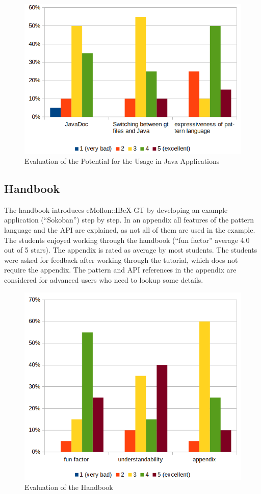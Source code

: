 \begin{figure}[h!]
	\centering
	\includegraphics[width=0.65\linewidth]{../common/figures/evaluation-results-java-integration}
	\caption{Evaluation of the Potential for the Usage in Java Applications}
	\label{fig:evaluation-results-java-integration}
\end{figure}

\subsection{Handbook}
\label{evaluation-handbook}
The handbook \cite{eMoflonIBeX-GT-Handbook} introduces eMoflon::IBeX-GT by developing an example application (``Sokoban'') step by step.
In an appendix all features of the pattern language and the API are explained, as not all of them are used in the example.
The students enjoyed working through the handbook (``fun factor'' average 4.0 out of 5 stars).
The appendix is rated as average by most students.
The students were asked for feedback after working through the tutorial, which does not require the appendix.
The pattern and API references in the appendix are considered for advanced users who need to lookup some details.

\begin{figure}[h!]
	\centering
	\includegraphics[width=0.65\linewidth]{../common/figures/evaluation-results-handbook}
	\caption{Evaluation of the Handbook}
	\label{fig:evaluation-results-handbook}
\end{figure}
